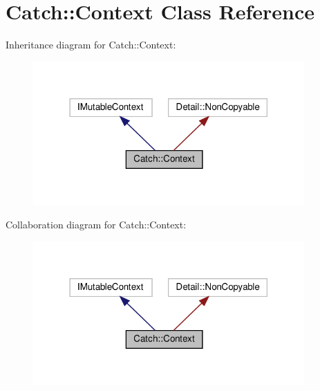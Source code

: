 \hypertarget{classCatch_1_1Context}{}\section{Catch\+:\+:Context Class Reference}
\label{classCatch_1_1Context}


Inheritance diagram for Catch\+:\+:Context\+:
\nopagebreak
\begin{figure}[H]
\begin{center}
\leavevmode
\includegraphics[width=294pt]{classCatch_1_1Context__inherit__graph}
\end{center}
\end{figure}


Collaboration diagram for Catch\+:\+:Context\+:
\nopagebreak
\begin{figure}[H]
\begin{center}
\leavevmode
\includegraphics[width=294pt]{classCatch_1_1Context__coll__graph}
\end{center}
\end{figure}

